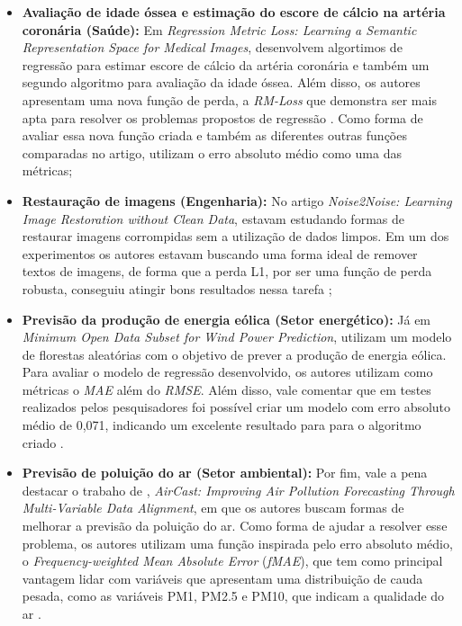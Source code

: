 \begin{itemize}
    \item \textbf{Avaliação de idade óssea e estimação do escore de cálcio na artéria coronária (Saúde):} Em \textit{Regression Metric Loss: Learning a Semantic Representation Space for Medical Images}, \textcite{chao2022regressionmetriclosslearning} desenvolvem algortimos de regressão para estimar escore de cálcio da artéria coronária e também um segundo algoritmo para avaliação da idade óssea. Além disso, os autores apresentam uma nova função de perda, a \textit{RM-Loss} que demonstra ser mais apta para resolver os problemas propostos de regressão \parencite{chao2022regressionmetriclosslearning}. Como forma de avaliar essa nova função criada e também as diferentes outras funções comparadas no artigo, \textcite{chao2022regressionmetriclosslearning} utilizam o erro absoluto médio como uma das métricas;
    \item \textbf{Restauração de imagens (Engenharia):} No artigo \textit{Noise2Noise: Learning Image Restoration without Clean Data}, \textcite{Noise2Noise} estavam estudando formas de restaurar imagens corrompidas sem a utilização de dados limpos. Em um dos experimentos os autores estavam buscando uma forma ideal de remover textos de imagens, de forma que a perda L1, por ser uma função de perda robusta, conseguiu atingir bons resultados nessa tarefa \parencite{Noise2Noise};
    \item \textbf{Previsão da produção de energia eólica (Setor energético):} Já em \textit{Minimum Open Data Subset for Wind Power Prediction}, \textcite{MinimumOpenDataSubsetForWindPowerPrediction} utilizam um modelo de florestas aleatórias com o objetivo de prever a produção de energia eólica. Para avaliar o modelo de regressão desenvolvido, os autores utilizam como métricas o \textit{MAE} além do \textit{RMSE}. Além disso, vale comentar que em testes realizados pelos pesquisadores foi possível criar um modelo com erro absoluto médio de 0,071, indicando um excelente resultado para para o algoritmo criado \parencite{MinimumOpenDataSubsetForWindPowerPrediction}.
    \item \textbf{Previsão de poluição do ar (Setor ambiental):} Por fim, vale a pena destacar o trabaho de \textcite{nedungadi2025aircastimprovingairpollution}, \textit{AirCast: Improving Air Pollution Forecasting Through Multi-Variable Data Alignment}, em que os autores buscam formas de melhorar a previsão da poluição do ar. Como forma de ajudar a resolver esse problema, os autores utilizam uma função inspirada pelo erro absoluto médio, o \textit{Frequency-weighted Mean Absolute Error} (\textit{fMAE}), que tem como principal vantagem lidar com variáveis que apresentam uma distribuição de cauda pesada, como as variáveis PM1, PM2.5 e PM10, que indicam a qualidade do ar \parencite{nedungadi2025aircastimprovingairpollution}.
\end{itemize}

